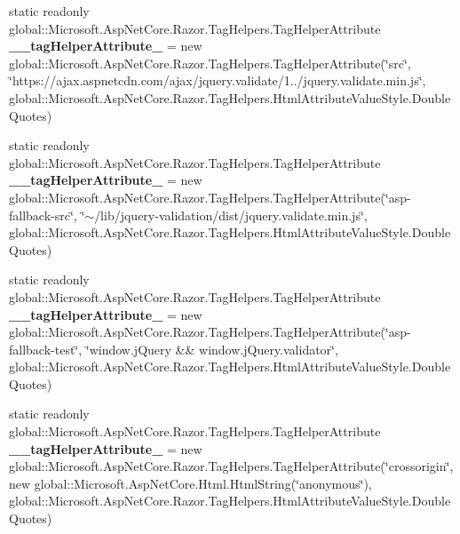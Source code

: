 \begin{DoxyCompactItemize}
static readonly global\+::\+Microsoft.\+Asp\+Net\+Core.\+Razor.\+Tag\+Helpers.\+Tag\+Helper\+Attribute {\bfseries \+\_\+\+\_\+tag\+Helper\+Attribute\+\_} = new global\+::\+Microsoft.\+Asp\+Net\+Core.\+Razor.\+Tag\+Helpers.\+Tag\+Helper\+Attribute(\char`\"{}src\char`\"{}, \char`\"{}https\+://ajax.\+aspnetcdn.\+com/ajax/jquery.\+validate/1../jquery.\+validate.\+min.\+js\char`\"{}, global\+::\+Microsoft.\+Asp\+Net\+Core.\+Razor.\+Tag\+Helpers.\+Html\+Attribute\+Value\+Style.\+Double\+Quotes)
\item 
\mbox{\label{class_asp_net_core_1_1_views___shared_____validation_scripts_partial_ac535800f4a4cbea8c538f6b7bf58633c}} 
static readonly global\+::\+Microsoft.\+Asp\+Net\+Core.\+Razor.\+Tag\+Helpers.\+Tag\+Helper\+Attribute {\bfseries \+\_\+\+\_\+tag\+Helper\+Attribute\+\_} = new global\+::\+Microsoft.\+Asp\+Net\+Core.\+Razor.\+Tag\+Helpers.\+Tag\+Helper\+Attribute(\char`\"{}asp-\/fallback-\/src\char`\"{}, \char`\"{}$\sim$/lib/jquery-\/validation/dist/jquery.\+validate.\+min.\+js\char`\"{}, global\+::\+Microsoft.\+Asp\+Net\+Core.\+Razor.\+Tag\+Helpers.\+Html\+Attribute\+Value\+Style.\+Double\+Quotes)
\item 
\mbox{\label{class_asp_net_core_1_1_views___shared_____validation_scripts_partial_a37d6a60ae7f0a20284364dabbf9d38f7}} 
static readonly global\+::\+Microsoft.\+Asp\+Net\+Core.\+Razor.\+Tag\+Helpers.\+Tag\+Helper\+Attribute {\bfseries \+\_\+\+\_\+tag\+Helper\+Attribute\+\_} = new global\+::\+Microsoft.\+Asp\+Net\+Core.\+Razor.\+Tag\+Helpers.\+Tag\+Helper\+Attribute(\char`\"{}asp-\/fallback-\/test\char`\"{}, \char`\"{}window.\+j\+Query \&\& window.\+j\+Query.\+validator\char`\"{}, global\+::\+Microsoft.\+Asp\+Net\+Core.\+Razor.\+Tag\+Helpers.\+Html\+Attribute\+Value\+Style.\+Double\+Quotes)
\item 
\mbox{\label{class_asp_net_core_1_1_views___shared_____validation_scripts_partial_a27fc641bb08435467eb7fabdd3366a50}} 
static readonly global\+::\+Microsoft.\+Asp\+Net\+Core.\+Razor.\+Tag\+Helpers.\+Tag\+Helper\+Attribute {\bfseries \+\_\+\+\_\+tag\+Helper\+Attribute\+\_} = new global\+::\+Microsoft.\+Asp\+Net\+Core.\+Razor.\+Tag\+Helpers.\+Tag\+Helper\+Attribute(\char`\"{}crossorigin\char`\"{}, new global\+::\+Microsoft.\+Asp\+Net\+Core.\+Html.\+Html\+String(\char`\"{}anonymous\char`\"{}), global\+::\+Microsoft.\+Asp\+Net\+Core.\+Razor.\+Tag\+Helpers.\+Html\+Attribute\+Value\+Style.\+Double\+Quotes)

\end{DoxyCompactItemize}
